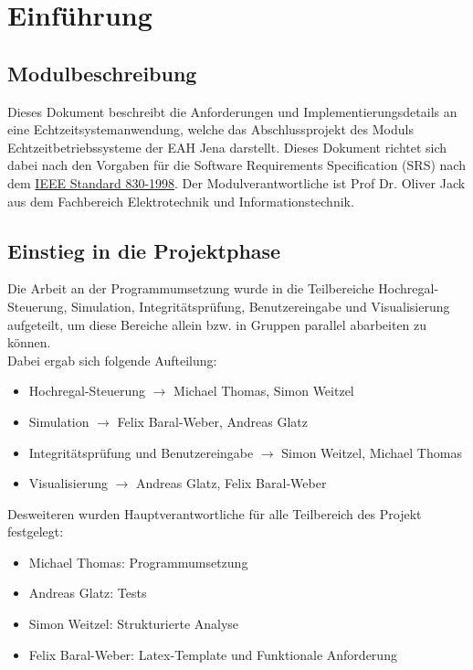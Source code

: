 \section{Einführung}
\subsection{Modulbeschreibung}
Dieses Dokument beschreibt die Anforderungen und Implementierungsdetails an eine Echtzeitsystemanwendung, welche das Abschlussprojekt des Moduls Echtzeitbetriebssysteme der EAH Jena darstellt. Dieses Dokument richtet sich dabei nach den Vorgaben für die Software Requirements Specification (SRS) nach dem \href{https://de.wikipedia.org/wiki/Software_Requirements_Specification}{IEEE Standard 830-1998}. Der Modulverantwortliche ist Prof Dr. Oliver Jack aus dem Fachbereich Elektrotechnik und Informationstechnik.\\

\subsection{Einstieg in die Projektphase}
Die Arbeit an der Programmumsetzung wurde in die Teilbereiche Hochregal-Steuerung, Simulation, Integritätsprüfung, Benutzereingabe und Visualisierung aufgeteilt, um diese Bereiche allein bzw. in Gruppen parallel  abarbeiten zu können.\\
Dabei ergab sich folgende Aufteilung:
\begin{itemize} 
	\item Hochregal-Steuerung $\rightarrow$ Michael Thomas, Simon Weitzel
	\item Simulation $\rightarrow$ Felix Baral-Weber, Andreas Glatz
	\item Integritätsprüfung und Benutzereingabe $\rightarrow$ Simon Weitzel, Michael Thomas
	\item Visualisierung $\rightarrow$ Andreas Glatz, Felix Baral-Weber
\end{itemize}

Desweiteren wurden Hauptverantwortliche für alle Teilbereich des Projekt festgelegt:\\

\begin{itemize} 
	\item Michael Thomas: Programmumsetzung
	\item Andreas Glatz: Tests
	\item Simon Weitzel: Strukturierte Analyse
	\item Felix Baral-Weber: Latex-Template und Funktionale Anforderung
\end{itemize}